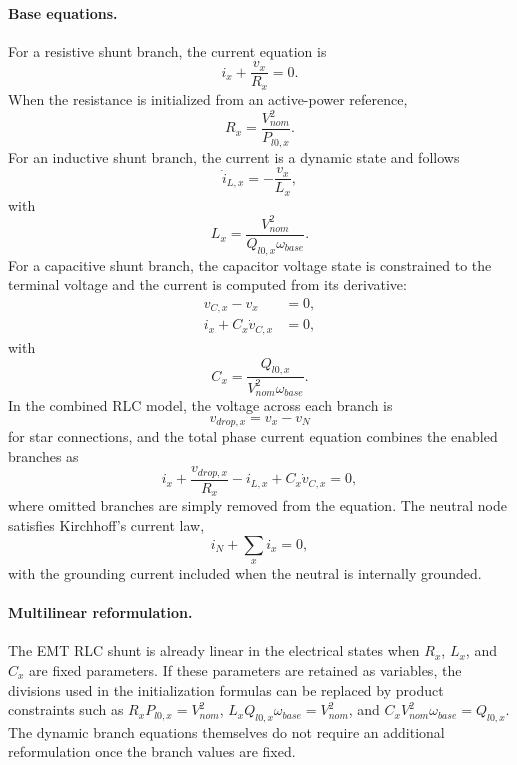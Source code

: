 \paragraph{Base equations.}
For a resistive shunt branch, the current equation is
\begin{equation}
    i_x + \frac{v_x}{R_x}=0.
\end{equation}
When the resistance is initialized from an active-power reference,
\begin{equation}
    R_x = \frac{V_{nom}^2}{P_{l0,x}}.
\end{equation}
For an inductive shunt branch, the current is a dynamic state and follows
\begin{equation}
    \dot{i}_{L,x} = -\frac{v_x}{L_x},
\end{equation}
with
\begin{equation}
    L_x = \frac{V_{nom}^2}{Q_{l0,x}\omega_{base}}.
\end{equation}
For a capacitive shunt branch, the capacitor voltage state is constrained to the terminal voltage and the current is computed from its derivative:
\begin{align}
    v_{C,x} - v_x &= 0, \\
    i_x + C_x \dot{v}_{C,x} &= 0,
\end{align}
with
\begin{equation}
    C_x = \frac{Q_{l0,x}}{V_{nom}^2\omega_{base}}.
\end{equation}
In the combined RLC model, the voltage across each branch is
\begin{equation}
    v_{drop,x}=v_x-v_N
\end{equation}
for star connections, and the total phase current equation combines the enabled branches as
\begin{equation}
    i_x + \frac{v_{drop,x}}{R_x} - i_{L,x} + C_x \dot{v}_{C,x}=0,
\end{equation}
where omitted branches are simply removed from the equation. The neutral node satisfies Kirchhoff's current law,
\begin{equation}
    i_N + \sum_x i_x = 0,
\end{equation}
with the grounding current included when the neutral is internally grounded.

\paragraph{Multilinear reformulation.}
The EMT RLC shunt is already linear in the electrical states when $R_x$, $L_x$, and $C_x$ are fixed parameters. If these parameters are retained as variables, the divisions used in the initialization formulas can be replaced by product constraints such as $R_xP_{l0,x}=V_{nom}^2$, $L_xQ_{l0,x}\omega_{base}=V_{nom}^2$, and $C_xV_{nom}^2\omega_{base}=Q_{l0,x}$. The dynamic branch equations themselves do not require an additional reformulation once the branch values are fixed.

